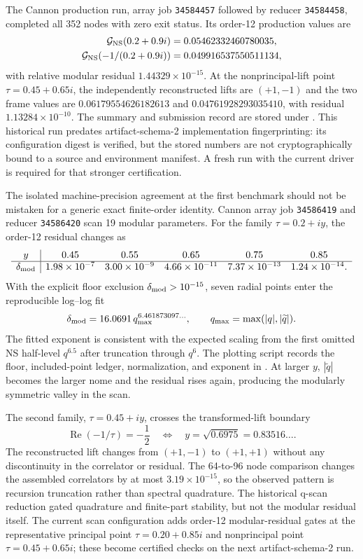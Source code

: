 \documentclass[11pt]{article}
\newcommand{\NS}{\mathrm{NS}}
\begin{document}
The Cannon production run, array job \texttt{34584457} followed by reducer
\texttt{34584458}, completed all 352 nodes with zero exit status.  Its
order-12 production values are
\begin{align}
 \mathcal G_{\NS}(0.2+0.9i)
 &=0.05462332460780035,\notag\\
 \mathcal G_{\NS}\!\left(-1/(0.2+0.9i)\right)
 &=0.049916537550511134,
\end{align}
with relative modular residual $1.44329\times10^{-15}$.  At the
nonprincipal-lift point $\tau=0.45+0.65i$, the independently reconstructed
lifts are $(+1,-1)$ and the two frame values are
$0.06179554626182613$ and $0.04761928293035410$, with residual
$1.13284\times10^{-10}$.  The summary and submission record are stored under
.  This
historical run predates artifact-schema-2 implementation fingerprinting: its
configuration digest is verified, but the stored numbers are not
cryptographically bound to a source and environment manifest.  A fresh run
with the current driver is required for that stronger certification.

The isolated machine-precision agreement at the first benchmark should not
be mistaken for a generic exact finite-order identity.  Cannon array job
\texttt{34586419} and reducer \texttt{34586420} scan 19 modular parameters.
For the family $\tau=0.2+iy$, the order-12 residual changes as
\[
\begin{array}{c|ccccc}
y&0.45&0.55&0.65&0.75&0.85\\ \hline
\delta_{\rm mod}
&1.98\times10^{-7}&3.00\times10^{-9}&4.66\times10^{-11}
&7.37\times10^{-13}&1.24\times10^{-14}.
\end{array}
\]
With the explicit floor exclusion
$\delta_{\rm mod}>10^{-15}$, seven radial points enter the reproducible
log--log fit
\[
 \delta_{\rm mod}=16.0691\,q_{\max}^{6.461873097\ldots},
 \qquad q_{\max}=\max(|q|,|\widetilde q|).
\]
The fitted exponent is consistent with the expected scaling from the first
omitted NS half-level $q^{6.5}$ after truncation through $q^6$.
The plotting script records the floor, included-point ledger, normalization,
and exponent in .
At larger $y$, $|\widetilde q|$ becomes the larger nome and the residual
rises again, producing the modularly symmetric valley in the scan.

The second family, $\tau=0.45+iy$, crosses the transformed-lift boundary
\[
 \operatorname{Re}(-1/\tau)=-\frac12
 \quad\Longleftrightarrow\quad
 y=\sqrt{0.6975}=0.83516\ldots .
\]
The reconstructed lift changes from $(+1,-1)$ to $(+1,+1)$ without any
discontinuity in the correlator or residual.  The 64-to-96 node comparison
changes the assembled correlators by at most $3.19\times10^{-15}$, so the
observed pattern is recursion truncation rather than spectral quadrature.
The historical q-scan reduction gated quadrature and finite-part stability,
but not the modular residual itself.  The current scan configuration adds
order-12 modular-residual gates at the representative principal point
$\tau=0.20+0.85i$ and nonprincipal point $\tau=0.45+0.65i$; these become
certified checks on the next artifact-schema-2 run.
\end{document}
